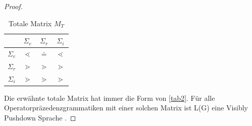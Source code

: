 \begin{proof}
\begin{table}
\begin{center}
\begin{tabular}[c]{c | c | c | c }
	&	$\Sigma_c$ & $\Sigma_r$ & $\Sigma_i$ \\ \hline
$\Sigma_c$ & $\lessdot$ 	& $\doteq$	& $\lessdot$	\\ \hline
$\Sigma_r$ & $\gtrdot$	&$\gtrdot$		&$\gtrdot$		\\ \hline
$\Sigma_i$	&$\gtrdot$		&$\gtrdot$		&$\gtrdot$		\\
\end{tabular}
\caption{Totale Matrix $M_T$}
\label{tab2}
\end{center}
\end{table}
Die erwähnte totale Matrix hat immer die Form von \autoref{tab2}. Für alle Operatorpräzedenzgrammatiken mit einer solchen Matrix ist L(G) eine Visibly Pushdown Sprache \cite{op_vpl_property}.


\end{proof}
